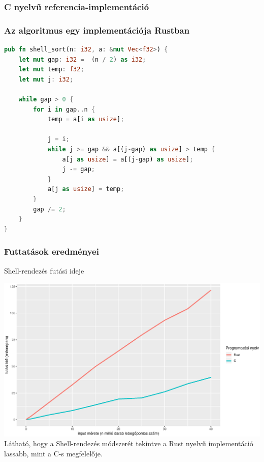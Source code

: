\subsubsection{C nyelvű referencia-implementáció}
\subsubsection{Az algoritmus egy implementációja Rustban}
\begin{lstlisting}[language=Rust]
pub fn shell_sort(n: i32, a: &mut Vec<f32>) {
	let mut gap: i32 =  (n / 2) as i32;
	let mut temp: f32;
	let mut j: i32;
	
	while gap > 0 {
		for i in gap..n {
			temp = a[i as usize];
			
			j = i;
			while j >= gap && a[(j-gap) as usize] > temp {
				a[j as usize] = a[(j-gap) as usize];
				j -= gap;
			}
			a[j as usize] = temp;
		}
		gap /= 2;
	}
}
\end{lstlisting}
\subsubsection{Futtatások eredményei}
Shell-rendezés futási ideje

\includegraphics[width=15.5cm]{kepek/shell_run.eps}
Látható, hogy a Shell-rendezés módszerét tekintve a Rust nyelvű implementáció lassabb, mint a C-s megfelelője.

